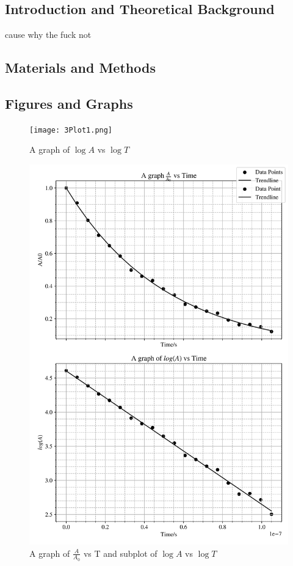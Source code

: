 \documentclass[12pt, a4paper]{article}
\begin{document}
\subsection{Introduction and Theoretical Background}
cause why the fuck not

\subsection{Materials and Methods}

\subsection{Figures and Graphs}
\begin{figure}[H]
    \centering
    \texttt{[image: 3Plot1.png]}
    \caption{A graph of \(\log{A}\) vs \(\log{T}\)}
\end{figure}

\begin{figure}[H]
    \centering
    \includegraphics[width = \textwidth]{3Plot2.png}
    \caption{A graph of \(\frac{A}{A_0}\) vs T and subplot of \(\log{A}\) vs \(\log{T}\)}
\end{figure}
\end{document}
